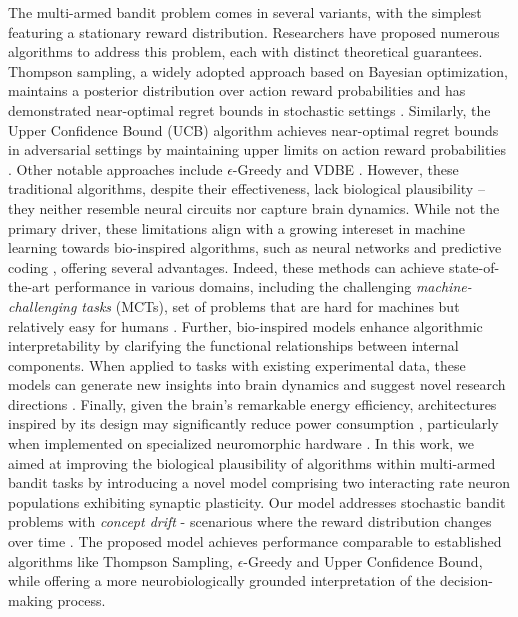 The multi-armed bandit problem comes in several variants, with the simplest featuring a stationary reward distribution. Researchers have proposed numerous algorithms to address this problem, each with distinct theoretical guarantees.
Thompson sampling, a widely adopted approach based on Bayesian optimization, maintains a posterior distribution over action reward probabilities and has demonstrated near-optimal regret bounds in stochastic settings \cite{agrawalAnalysisThompsonSampling2012, kaufmannThompsonSamplingAsymptotically2012}.
Similarly, the Upper Confidence Bound (UCB) algorithm achieves near-optimal regret bounds in adversarial settings by maintaining upper limits on action reward probabilities \cite{auerFinitetimeAnalysisMultiarmed2002}.
Other notable approaches include $\epsilon$-Greedy and VDBE \cite{gittinsBanditProcessesDynamic1979, banMultifacetContextualBandits2021, tokicAdaptiveEGreedyExploration2010, tokicValueDifferenceBasedExploration2011}.
However, these traditional algorithms, despite their effectiveness, lack biological plausibility – they neither resemble neural circuits nor capture brain dynamics. While not the primary driver, these limitations align with a growing intereset in machine learning towards bio-inspired algorithms,
such as neural networks and predictive coding \cite{leeBraininspiredPredictiveCoding2022, spratlingReviewPredictiveCoding2017}, offering several advantages.
Indeed, these methods can achieve state-of-the-art performance in various domains, including the challenging \textit{machine-challenging tasks} (MCTs), set of problems that are hard for machines but relatively easy for humans \cite{schmidgallBraininspiredLearningArtificial2024, hassabisNeuroscienceInspiredArtificialIntelligence2017, leeBraininspiredPredictiveCoding2022}.
Further, bio-inspired models enhance algorithmic interpretability by clarifying the functional relationships between internal components. When applied to tasks with existing experimental data, these models can generate new insights into brain dynamics and suggest novel research directions \cite{liuSeeingBelievingBrainInspired2023}.
Finally, given the brain's remarkable energy efficiency, architectures inspired by its design may significantly reduce power consumption \cite{EvaluationBioInspiredModels}, particularly when implemented on specialized neuromorphic hardware \cite{ReviewNeuroscienceInspiredMachine}.
\hfill \break
\indent In this work, we aimed at improving the biological plausibility of algorithms within multi-armed bandit tasks by introducing a novel model comprising two interacting rate neuron populations exhibiting synaptic plasticity.
Our model addresses stochastic bandit problems with \textit{concept drift} - scenarious where the reward distribution changes over time \cite{garivierUpperConfidenceBoundPolicies2008, besbesStochasticMultiArmedBanditProblem2014, cavenaghiNonStationaryMultiArmed2021}.
The proposed model achieves performance comparable to established algorithms like Thompson Sampling, $\epsilon$-Greedy and Upper Confidence Bound, while offering a more neurobiologically grounded interpretation of the decision-making process.

